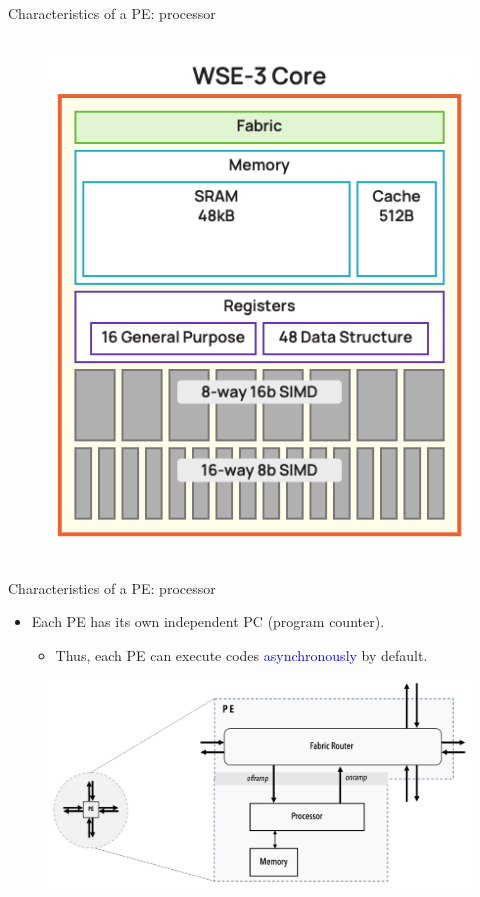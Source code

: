 \documentclass[dvipdfmx, 11pt, aspectratio=169]{beamer}   %
\begin{document}
\begin{frame}{Characteristics of a PE: processor}
\begin{columns}
\begin{figure}
    \includegraphics[scale=0.22]{img/wse3Core.png}
\end{figure}
\end{columns}
\end{frame}
\begin{frame}{Characteristics of a PE: processor}
\begin{itemize}
    \item Each PE has its own independent PC (program counter).
    \begin{itemize}
        \item Thus, each PE can execute codes \textcolor{blue}{asynchronously} by default.
    \end{itemize}
\end{itemize}
\begin{figure}
    \includegraphics[scale=0.15]{img/pe-symbolic.png}
\end{figure}
\end{frame}
\end{document}
